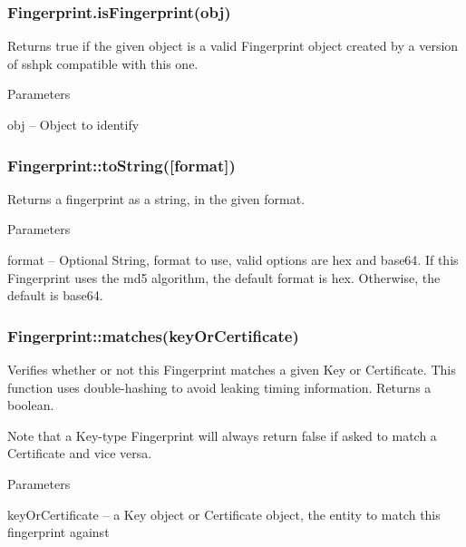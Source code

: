\subsubsection*{{\ttfamily Fingerprint.\+is\+Fingerprint(obj)}}

Returns {\ttfamily true} if the given object is a valid {\ttfamily Fingerprint} object created by a version of {\ttfamily sshpk} compatible with this one.

Parameters


\begin{DoxyItemize}
\item {\ttfamily obj} -- Object to identify
\end{DoxyItemize}

\subsubsection*{{\ttfamily Fingerprint\+::to\+String(\mbox{[}format\mbox{]})}}

Returns a fingerprint as a string, in the given format.

Parameters


\begin{DoxyItemize}
\item {\ttfamily format} -- Optional String, format to use, valid options are {\ttfamily hex} and {\ttfamily base64}. If this {\ttfamily Fingerprint} uses the {\ttfamily md5} algorithm, the default format is {\ttfamily hex}. Otherwise, the default is {\ttfamily base64}.
\end{DoxyItemize}

\subsubsection*{{\ttfamily Fingerprint\+::matches(key\+Or\+Certificate)}}

Verifies whether or not this {\ttfamily Fingerprint} matches a given {\ttfamily Key} or {\ttfamily Certificate}. This function uses double-\/hashing to avoid leaking timing information. Returns a boolean.

Note that a {\ttfamily Key}-\/type Fingerprint will always return {\ttfamily false} if asked to match a {\ttfamily Certificate} and vice versa.

Parameters


\begin{DoxyItemize}
\item {\ttfamily key\+Or\+Certificate} -- a {\ttfamily Key} object or {\ttfamily Certificate} object, the entity to match this fingerprint against
\end{DoxyItemize}

